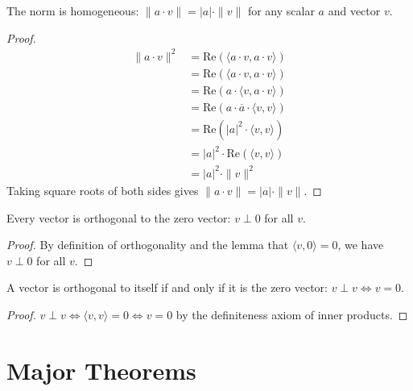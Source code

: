 \begin{theorem}
  \label{theorem : sca_mul}
  \leanok
  The norm is homogeneous: $\|a \cdot v\| = |a| \cdot \|v\|$ for any scalar $a$ and vector $v$.
\end{theorem}
\begin{proof}
  \begin{align}
  \|a \cdot v\|^2 &= \text{Re}(\langle a \cdot v, a \cdot v \rangle) \\
  &= \text{Re}(\langle a \cdot v, a \cdot v \rangle) \\
  &= \text{Re}(a \cdot \langle v, a \cdot v \rangle) \\
  &= \text{Re}(a \cdot \overline{a} \cdot \langle v, v \rangle) \\
  &= \text{Re}(|a|^2 \cdot \langle v, v \rangle) \\
  &= |a|^2 \cdot \text{Re}(\langle v, v \rangle) \\
  &= |a|^2 \cdot \|v\|^2
  \end{align}
  Taking square roots of both sides gives $\|a \cdot v\| = |a| \cdot \|v\|$.
\end{proof}

\begin{theorem}
  \label{theorem : ortho_zero}
  \leanok
  Every vector is orthogonal to the zero vector: $v \perp 0$ for all $v$.
\end{theorem}
\begin{proof}
  By definition of orthogonality and the lemma that $\langle v, 0 \rangle = 0$, we have $v \perp 0$ for all $v$.
\end{proof}

\begin{theorem}
  \label{theorem : ortho_self_zero}
  \leanok
  A vector is orthogonal to itself if and only if it is the zero vector: $v \perp v \iff v = 0$.
\end{theorem}
\begin{proof}
  $v \perp v \iff \langle v, v \rangle = 0 \iff v = 0$ by the definiteness axiom of inner products.
\end{proof}

\section{Major Theorems}

